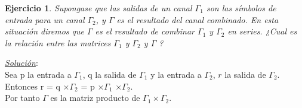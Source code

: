 \documentclass{beamer}
\theoremstyle{plain}
\theoremstyle{example}
\newtheorem{ejercicio} [Ejercicio]{Ejercicio}
\theoremstyle{example}
\begin{document}


\begin{frame}  \small \begin{ejercicio} 

Supongase que las salidas de un canal $\Gamma_1$ son las símbolos de entrada para un canal $\Gamma_2$, y $\Gamma$ es el resultado del canal combinado. En esta situación diremos que $\Gamma$ es el resultado de combinar $\Gamma_1$ y $\Gamma_2$ en series. ¿Cual es la relación entre las matrices  $\Gamma_1$ y $\Gamma_2$ y  $\Gamma$ ?
\end{ejercicio}

\textit{\underline{Solución}}:\\
\vspace{0.5cm}
Sea p la entrada a $\Gamma_1$, q la salida de $\Gamma_1$  y la entrada a $\Gamma_2$, $r$ la salida de $\Gamma_2$.\\
\vspace{0.3cm}
Entonces  r = q $\times \Gamma_2$  = p $\times \Gamma_1$ $ \times \Gamma_2$.\\
\vspace{0.3cm}
Por tanto $\Gamma$ es la matriz producto de $\Gamma_1 \times \Gamma_2$.

\end{frame} 
\end{document}
